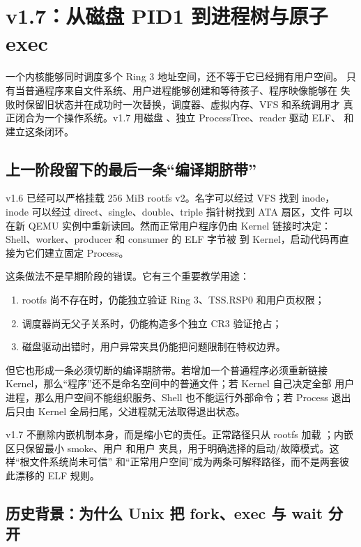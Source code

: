 \section{v1.7：从磁盘 PID1 到进程树与原子 exec}

\begin{keyidea}
一个内核能够同时调度多个 Ring 3 地址空间，还不等于它已经拥有用户空间。
只有当普通程序来自文件系统、用户进程能够创建和等待孩子、程序映像能够在
失败时保留旧状态并在成功时一次替换，调度器、虚拟内存、VFS 和系统调用才
真正闭合为一个操作系统。v1.7 用磁盘 、独立
ProcessTree、reader 驱动 ELF、 和
 建立这条闭环。
\end{keyidea}

\subsection{上一阶段留下的最后一条“编译期脐带”}

v1.6 已经可以严格挂载 256 MiB rootfs v2。名字可以经过 VFS 找到 inode，
inode 可以经过 direct、single、double、triple 指针树找到 ATA 扇区，文件
可以在新 QEMU 实例中重新读回。然而正常用户程序仍由 Kernel 链接时决定：
Shell、worker、producer 和 consumer 的 ELF 字节被  到
Kernel，启动代码再直接为它们建立固定 Process。

这条做法不是早期阶段的错误。它有三个重要教学用途：

\begin{enumerate}
  \item rootfs 尚不存在时，仍能独立验证 Ring 3、TSS.RSP0 和用户页权限；
  \item 调度器尚无父子关系时，仍能构造多个独立 CR3 验证抢占；
  \item 磁盘驱动出错时，用户异常夹具仍能把问题限制在特权边界。
\end{enumerate}

但它也形成一条必须切断的编译期脐带。若增加一个普通程序必须重新链接
Kernel，那么“程序”还不是命名空间中的普通文件；若 Kernel 自己决定全部
用户进程，那么用户空间不能组织服务、Shell 也不能运行外部命令；若 Process
退出后只由 Kernel 全局扫尾，父进程就无法取得退出状态。

v1.7 不删除内嵌机制本身，而是缩小它的责任。正常路径只从 rootfs 加载
；内嵌区只保留最小 smoke、用户  和用户
 夹具，用于明确选择的启动/故障模式。这样“根文件系统尚未可信”
和“正常用户空间”成为两条可解释路径，而不是两套彼此漂移的 ELF 规则。

\subsection{历史背景：为什么 Unix 把 fork、exec 与 wait 分开}

